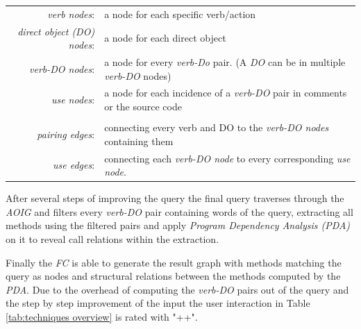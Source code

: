 \begin{table}[th]
	\begin{tabular}{r l}
		\textit{verb nodes}: & a node for each specific verb/action \\
		\textit{direct object (DO) nodes}: & a node for each direct object \\
		\textit{verb-DO nodes}: & a node for every \textit{verb-Do} pair. (A \textit{DO} can be in multiple \textit{verb-DO} nodes) \\
		\textit{use nodes}: & a node for each incidence of a \textit{verb-DO} pair in comments or the source code \\
		 & \\
		\textit{pairing edges}: & connecting every verb and DO to the \textit{verb-DO nodes} containing them \\
		\textit{use edges}: & connecting each \textit{verb-DO node} to every corresponding \textit{use node}.
	\end{tabular}
\end{table}

After several steps of improving the query the final query traverses through the \textit{AOIG} and filters every \textit{verb-DO} pair containing words of the query, extracting all methods using the filtered pairs and apply \textit{Program Dependency Analysis (PDA)} on it to reveal call relations within the extraction.

Finally the \emph{FC} is able to generate the result graph with methods matching the query as nodes and structural relations between the methods computed by the \textit{PDA}. \cite{shepherd2007using} \newline
Due to the overhead of computing the \textit{verb-DO} pairs out of the query and the step by step improvement of the input the user interaction in Table \ref{tab:techniques overview} is rated with "++".

